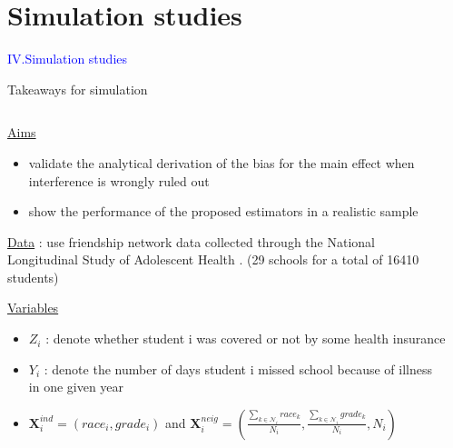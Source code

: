 \documentclass[notes,11pt, aspectratio=169]{beamer}
\begin{document}
\section{Simulation studies}
\begin{transitionframe}
  \begin{center}
    { \Huge \textcolor{blue}{IV.Simulation studies}}
  \end{center}
\end{transitionframe}

\begin{frame}{Takeaways for simulation}
\begin{columns}[T] %
\begin{column}{.9\textwidth}
\begin{wideitemize}
    \item \underline{Aims}
    \begin{itemize}
        \item validate the analytical derivation of the bias for the main effect when interference is wrongly ruled out
        \item show the performance of the proposed estimators in a realistic sample
    \end{itemize}
    \item \underline{Data} : use friendship network data collected through the National Longitudinal Study of Adolescent Health . (29 schools for a total of 16410 students) 
    \item \underline{Variables} 
    \begin{itemize}
        \item $Z_i$ : denote whether student i  was covered  or not by some health insurance
        \item $Y_i$ : denote the number of days student i missed school because of illness in one given year
        \item $\mathbf{X}_{i}^{ind}=(race_i,grade_i)$ and $\mathbf{X}_{i}^{neig}=(\frac{\sum_{k \in \mathcal{N}_i}race_k}{N_i} , \frac{\sum_{k \in \mathcal{N}_i}grade_k}{N_i} , N_i)$
    \end{itemize}
\end{wideitemize}
\end{column}%
\hfill%
\begin{column}{.38\textwidth}

  \vspace{20pt}
  
  \vspace{20pt}
  
\end{column}%
\end{columns}
\end{frame}
\end{document}
